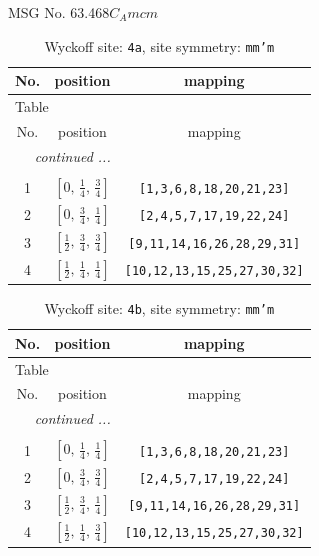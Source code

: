 \documentclass[fleqn,8pt]{jsarticle}
\begin{document}
\setcounter{MaxMatrixCols}{32}

\renewcommand{\tablename}{Table~}
\renewcommand{\figurename}{Figure~}
\begin{center}
\LARGE
MSG No. 63.468\quad$C_{A}mcm$
\end{center}
\renewcommand{\arraystretch}{1.2}
\begin{longtable}{ccc}
\caption{Wyckoff site: {\tt 4a}, site symmetry: {\tt mm'm}}
 \\
 \hline \hline
No. & position & mapping \\ \hline \endfirsthead

\multicolumn{2}{l}{\tablename\ \thetable{}} \\
 \hline \hline
No. & position & mapping \\ \hline \endhead

 \hline \hline
\multicolumn{2}{r}{\footnotesize\it continued ...} \\ \endfoot

 \hline \hline
\multicolumn{2}{r}{} \\ \endlastfoot

1 & $\left[ 0,\, \frac{1}{4},\, \frac{3}{4} \right]$ & {\tt [1,3,6,8,18,20,21,23]} \\ \hline
2 & $\left[ 0,\, \frac{3}{4},\, \frac{1}{4} \right]$ & {\tt [2,4,5,7,17,19,22,24]} \\ \hline
3 & $\left[ \frac{1}{2},\, \frac{3}{4},\, \frac{3}{4} \right]$ & {\tt [9,11,14,16,26,28,29,31]} \\ \hline
4 & $\left[ \frac{1}{2},\, \frac{1}{4},\, \frac{1}{4} \right]$ & {\tt [10,12,13,15,25,27,30,32]} \\
\end{longtable}
\renewcommand{\arraystretch}{1.2}
\begin{longtable}{ccc}
\caption{Wyckoff site: {\tt 4b}, site symmetry: {\tt mm'm}}
 \\
 \hline \hline
No. & position & mapping \\ \hline \endfirsthead

\multicolumn{2}{l}{\tablename\ \thetable{}} \\
 \hline \hline
No. & position & mapping \\ \hline \endhead

 \hline \hline
\multicolumn{2}{r}{\footnotesize\it continued ...} \\ \endfoot

 \hline \hline
\multicolumn{2}{r}{} \\ \endlastfoot

1 & $\left[ 0,\, \frac{1}{4},\, \frac{1}{4} \right]$ & {\tt [1,3,6,8,18,20,21,23]} \\ \hline
2 & $\left[ 0,\, \frac{3}{4},\, \frac{3}{4} \right]$ & {\tt [2,4,5,7,17,19,22,24]} \\ \hline
3 & $\left[ \frac{1}{2},\, \frac{3}{4},\, \frac{1}{4} \right]$ & {\tt [9,11,14,16,26,28,29,31]} \\ \hline
4 & $\left[ \frac{1}{2},\, \frac{1}{4},\, \frac{3}{4} \right]$ & {\tt [10,12,13,15,25,27,30,32]} \\
\end{longtable}
\end{document}
